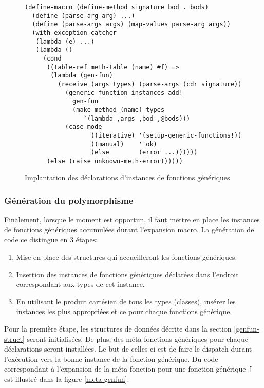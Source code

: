       \begin{figure}[h!]
        \begin{lstlisting}
(define-macro (define-method signature bod . bods)
  (define (parse-arg arg) ...)
  (define (parse-args args) (map-values parse-arg args))
  (with-exception-catcher
   (lambda (e) ...)
   (lambda ()
     (cond
      ((table-ref meth-table (name) #f) =>
       (lambda (gen-fun)
         (receive (args types) (parse-args (cdr signature))
           (generic-function-instances-add!
             gen-fun
             (make-method (name) types
                `(lambda ,args ,bod ,@bods)))
           (case mode
                  ((iterative) '(setup-generic-functions!))
                  ((manual)    ''ok)
                  (else        (error ...))))))
      (else (raise unknown-meth-error))))))
        \end{lstlisting}
        \caption{Implantation des déclarations d'instances de
          fonctions génériques}
        \label{defmeth}
      \end{figure}

    \subsubsection{Génération du polymorphisme}
      Finalement, lorsque le moment est opportun, il faut mettre en
      place les instances de fonctions génériques accumulées durant
      l'expansion macro. La génération de code ce distingue en 3 étapes:

      \begin{enumerate}
      \item Mise en place des structures qui accueilleront les
        fonctions génériques.
      \item Insertion des instances de fonctions génériques déclarées
        dans l'endroit correspondant aux types de cet instance.
      \item En utilisant le produit cartésien de tous les types
        (classes), insérer les instances les plus appropriées et ce
        pour chaque fonctions générique.
      \end{enumerate}

      Pour la première étape, les structures de données décrite dans
      la section \ref{genfun-struct} seront initialisées. De plus, des
      méta-fonctions génériques pour chaque déclarations seront
      installées. Le but de celles-ci est de faire le \og dispatch \fg
      durant l'exécution vers la bonne instance de la fonction
      générique. Du code correspondant à l'expansion de la
      méta-fonction pour une fonction générique \texttt{f} est
      illustré dans la figure \ref{meta-genfun}.
      
